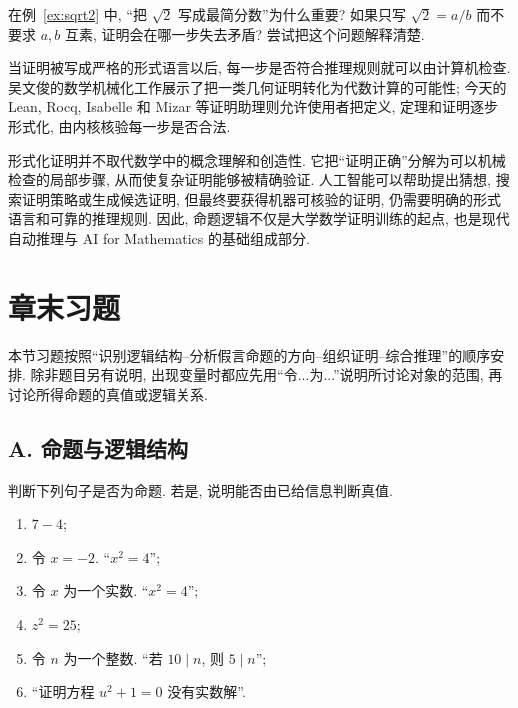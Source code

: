 \documentclass[usesamecnt, thmcnt=section, lang=cn, newtx, 10pt, scheme=chinese]{elegantbook}
\begin{document}
\begin{challenge}
\label{ch:logic-04}
在例~\ref{ex:sqrt2} 中, ``把 $\sqrt2$ 写成最简分数''为什么重要? 如果只写 $\sqrt2=a/b$ 而不要求 $a,b$ 互素, 证明会在哪一步失去矛盾? 尝试把这个问题解释清楚.
\end{challenge}

\begin{knowledge}[从形式化证明到机器验证]
当证明被写成严格的形式语言以后, 每一步是否符合推理规则就可以由计算机检查. 吴文俊的数学机械化工作展示了把一类几何证明转化为代数计算的可能性; 今天的 Lean, Rocq, Isabelle 和 Mizar 等证明助理则允许使用者把定义, 定理和证明逐步形式化, 由内核核验每一步是否合法.

形式化证明并不取代数学中的概念理解和创造性. 它把``证明正确''分解为可以机械检查的局部步骤, 从而使复杂证明能够被精确验证. 人工智能可以帮助提出猜想, 搜索证明策略或生成候选证明, 但最终要获得机器可核验的证明, 仍需要明确的形式语言和可靠的推理规则. 因此, 命题逻辑不仅是大学数学证明训练的起点, 也是现代自动推理与 AI for Mathematics 的基础组成部分.
\end{knowledge}

\section{章末习题}

本节习题按照``识别逻辑结构--分析假言命题的方向--组织证明--综合推理''的顺序安排. 除非题目另有说明, 出现变量时都应先用``令...为...''说明所讨论对象的范围, 再讨论所得命题的真值或逻辑关系.

\subsection*{A. 命题与逻辑结构}

\begin{exercise}
\label{ex:logic-17}
判断下列句子是否为命题. 若是, 说明能否由已给信息判断真值.
\begin{enumerate}[label=\rm(\arabic*)]
  \item $7-4$;
  \item 令 $x=-2$. ``$x^2=4$'';
  \item 令 $x$ 为一个实数. ``$x^2=4$'';
  \item $z^2=25$;
  \item 令 $n$ 为一个整数. ``若 $10\mid n$, 则 $5\mid n$'';
  \item ``证明方程 $u^2+1=0$ 没有实数解''.
\end{enumerate}
\end{exercise}
\end{document}
